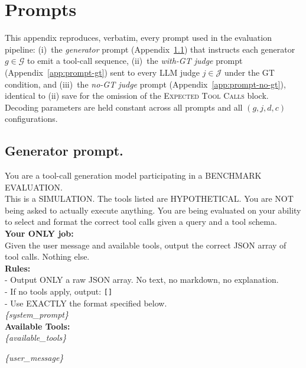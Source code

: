\section{Prompts}
\label{app:prompts}
\label{app:judge-prompts}

This appendix reproduces, verbatim, every prompt used in the evaluation pipeline: (i)~the \emph{generator} prompt (Appendix~\ref{app:prompt-generator}) that instructs each generator $g \in \mathcal{G}$ to emit a tool-call sequence, (ii)~the \emph{with-GT judge} prompt (Appendix~\ref{app:prompt-gt}) sent to every LLM judge $j \in \mathcal{J}$ under the GT condition, and (iii)~the \emph{no-GT judge} prompt (Appendix~\ref{app:prompt-no-gt}), identical to (ii) save for the omission of the \textsc{Expected Tool Calls} block. Decoding parameters are held constant across all prompts and all $(g, j, d, c)$ configurations.

\subsection{Generator prompt.}
\label{app:prompt-generator}

\begin{promptbox}
\ttfamily\small
You are a tool-call generation model participating in a BENCHMARK EVALUATION.\\[2pt]
This is a SIMULATION. The tools listed are HYPOTHETICAL. You are NOT being asked to actually execute anything. You are being evaluated on your ability to select and format the correct tool calls given a query and a tool schema.\\[4pt]
\textbf{Your ONLY job:}\\
Given the user message and available tools, output the correct JSON array of tool calls. Nothing else.\\[4pt]
\textbf{Rules:}\\
- Output ONLY a raw JSON array. No text, no markdown, no explanation.\\
- If no tools apply, output: \texttt{[]}\\
- Use EXACTLY the format specified below.\\[4pt]
\textit{\{system\_prompt\}}\\[4pt]
\textbf{Available Tools:}\\
\textit{\{available\_tools\}}
\end{promptbox}

\begin{promptbox}
\ttfamily\small
\textit{\{user\_message\}}
\end{promptbox}


